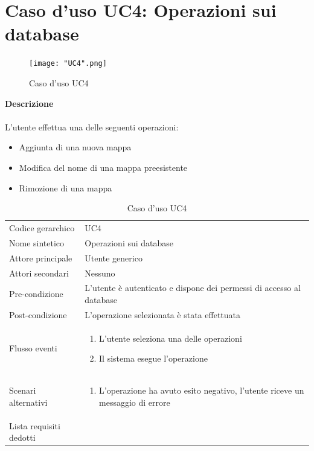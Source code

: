 \documentclass[a4paper]{report}
\begin{document}
	 \section{Caso d'uso UC4: Operazioni sui database}
	 \begin{figure}[H]
			\centering
			\texttt{[image: "UC4".png]}
			\caption{Caso d'uso UC4}
		\end{figure}
	 \textbf{Descrizione} \\ \\
	 L'utente effettua una delle seguenti operazioni:
	 \begin{itemize}
	 	\item Aggiunta di una nuova mappa
	 	\item Modifica del nome di una mappa preesistente
	 	\item Rimozione di una mappa
	 \end{itemize}
		\begin{table}[H]
		\begin{tabularx}{\textwidth}{X | X}\toprule
			\rowcolor{orange!65}Codice gerarchico & UC4 \\
			Nome sintetico & Operazioni sui database \\
			\rowcolor{orange!65}Attore principale & Utente generico\\
			Attori secondari & Nessuno \\
			\rowcolor{orange!65}Pre-condizione & L'utente è autenticato e dispone dei permessi di accesso
			al database\\
			Post-condizione & L'operazione selezionata è stata effettuata\\
			\rowcolor{orange!65}Flusso eventi & \begin{enumerate}
			\item L'utente seleziona una delle operazioni
			\item Il sistema esegue l'operazione
			\end{enumerate} \\
			Scenari alternativi & \begin{enumerate}
			\item L'operazione ha avuto esito negativo, l'utente riceve un messaggio di errore
			\end{enumerate} \\
			\rowcolor{orange!65}Lista requisiti dedotti & \\
			\bottomrule
		\end{tabularx}
		\caption{Caso d'uso UC4}
	 \end{table}
\end{document}
